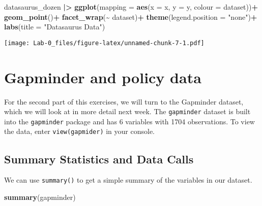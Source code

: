 \documentclass[
]{article}
\newenvironment{Shaded}{\begin{snugshade}}{\end{snugshade}}
\newcommand{\AttributeTok}[1]{\textcolor[rgb]{0.13,0.29,0.53}{#1}}
\newcommand{\FunctionTok}[1]{\textcolor[rgb]{0.13,0.29,0.53}{\textbf{#1}}}
\newcommand{\NormalTok}[1]{#1}
\newcommand{\SpecialCharTok}[1]{\textcolor[rgb]{0.81,0.36,0.00}{\textbf{#1}}}
\newcommand{\StringTok}[1]{\textcolor[rgb]{0.31,0.60,0.02}{#1}}
\begin{document}
\begin{Shaded}
\begin{Highlighting}[]
\NormalTok{datasaurus\_dozen }\SpecialCharTok{|\textgreater{}} 
  \FunctionTok{ggplot}\NormalTok{(}\AttributeTok{mapping =} \FunctionTok{aes}\NormalTok{(}\AttributeTok{x =}\NormalTok{ x, }\AttributeTok{y =}\NormalTok{ y, }\AttributeTok{colour =}\NormalTok{ dataset))}\SpecialCharTok{+}
  \FunctionTok{geom\_point}\NormalTok{()}\SpecialCharTok{+}
  \FunctionTok{facet\_wrap}\NormalTok{(}\SpecialCharTok{\textasciitilde{}}\NormalTok{ dataset)}\SpecialCharTok{+}
  \FunctionTok{theme}\NormalTok{(}\AttributeTok{legend.position =} \StringTok{"none"}\NormalTok{)}\SpecialCharTok{+}
  \FunctionTok{labs}\NormalTok{(}\AttributeTok{title =} \StringTok{"Datasaurus Data"}\NormalTok{)}
\end{Highlighting}
\end{Shaded}

\texttt{[image: Lab-0\_files/figure-latex/unnamed-chunk-7-1.pdf]}

\section{Gapminder and policy data}\label{gapminder-and-policy-data}

For the second part of this exercises, we will turn to the Gapminder
dataset, which we will look at in more detail next week. The
\texttt{gapminder} dataset is built into the \texttt{gapminder} package
and has 6 variables with 1704 observations. To view the data, enter
\texttt{view(gapmider)} in your console.

\subsection{Summary Statistics and Data
Calls}\label{summary-statistics-and-data-calls}

We can use \texttt{summary()} to get a simple summary of the variables
in our dataset.

\begin{Shaded}
\begin{Highlighting}[]
\FunctionTok{summary}\NormalTok{(gapminder)}
\end{Highlighting}
\end{Shaded}
\end{document}
